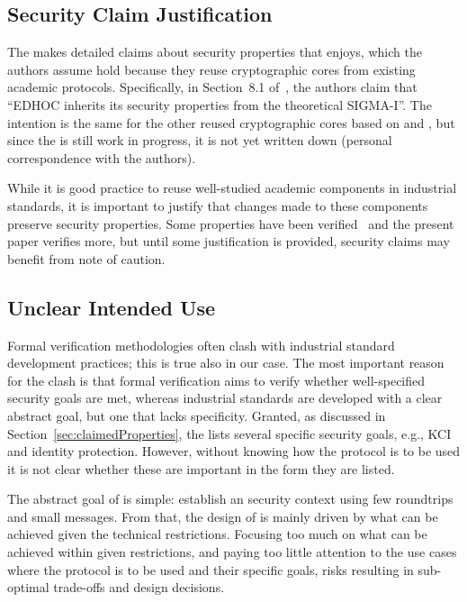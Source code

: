 \documentclass[runningheads, envcountsame, a4paper, draft, x11names]{llncs}
\newcommand{\spacehack}{\vspace{-1em}}
\newcommand{\fillhack}{\vspace{-0.5em}}
\begin{document}
\subsection{Security Claim Justification}
\label{sec:securityClaims}
\fillhack
The \mSpec{} makes detailed claims about security properties that \mEdhoc{}
enjoys, which the authors assume hold because they reuse cryptographic cores
from existing academic protocols.
%
Specifically, in Section~8.1 of~\cite{selander-lake-edhoc-01}, the authors
claim that ``EDHOC inherits its security properties from the theoretical
SIGMA-I''.
%
The intention is the same for the other reused cryptographic
cores based on \mOptls{} and \mNoise{}, but since the \mSpec{} is still work in
progress, it is not yet written down (personal correspondence with the authors).
%

While it is good practice to reuse well-studied academic components in
industrial standards, it is important to justify that changes made to these
components preserve security properties.
%
Some properties have been verified~\cite{DBLP:conf/secsr/BruniJPS18} and the
present paper verifies more, but until some justification is provided, security
claims may benefit from note of caution.
\spacehack

\subsection{Unclear Intended Use}
\label{sec:unclearProtocolUse}
\fillhack
Formal verification methodologies often clash with industrial standard
development practices; this is true also in our case.
%
The most important reason for the clash is that formal verification aims to
verify whether well-specified security goals are met, whereas industrial
standards are developed with a clear abstract goal,
but one that lacks specificity.
%
Granted, as discussed in Section~\ref{sec:claimedProperties}, the \mSpec{} lists
several specific security goals, e.g., KCI and identity protection.
%
However, without knowing how the protocol is to be used
it is not clear whether these are important in the form they are listed.
%

The abstract goal of \mEdhoc{} is simple: establish an \mOscore{} security
context using few roundtrips and small messages.
%
From that, the design of \mEdhoc{} is mainly driven by what
can be achieved given the technical restrictions.
%
Focusing too much on what can be achieved within given restrictions, and paying
too little attention to the use cases where the
protocol is to be used and their specific goals, risks resulting in
sub-optimal trade-offs and design decisions.
%
\end{document}
